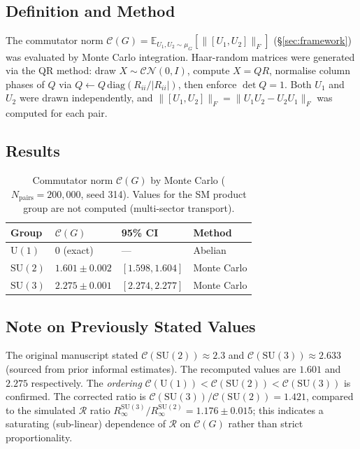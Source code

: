 \documentclass[12pt,a4paper]{article}
\newcommand{\R}{\mathcal{R}}           %
\newcommand{\SU}[1]{\mathrm{SU}(#1)}
\newcommand{\UN}[1]{\mathrm{U}(#1)}
\theoremstyle{plain}
\theoremstyle{definition}
\theoremstyle{remark}
\begin{document}
\subsection*{Definition and Method}

The commutator norm $\mathcal{C}(G) = \mathbb{E}_{U_1,U_2\sim\mu_G}[\|[U_1,U_2]\|_F]$
(§\ref{sec:framework}) was evaluated by Monte Carlo integration.
Haar-random matrices were generated via the QR method: draw
$X\sim\mathcal{CN}(0,I)$, compute $X=QR$, normalise column phases of $Q$ via
$Q \leftarrow Q\,\mathrm{diag}(R_{ii}/|R_{ii}|)$, then enforce $\det Q = 1$.
Both $U_1$ and $U_2$ were drawn independently, and
$\|[U_1,U_2]\|_F = \|U_1 U_2 - U_2 U_1\|_F$ was computed for each pair.

\subsection*{Results}

\begin{table}[H]
\centering
\caption{Commutator norm $\mathcal{C}(G)$ by Monte Carlo ($N_\text{pairs}=200{,}000$,
  seed 314). Values for the SM product group are not computed (multi-sector transport).}
\label{tab:commutator}
\begin{tabular}{llll}
\toprule
Group & $\mathcal{C}(G)$ & 95\% CI & Method \\
\midrule
$\UN{1}$ & $0$ (exact) & --- & Abelian \\
$\SU{2}$ & $1.601\pm0.002$ & $[1.598, 1.604]$ & Monte Carlo \\
$\SU{3}$ & $2.275\pm0.001$ & $[2.274, 2.277]$ & Monte Carlo \\
\bottomrule
\end{tabular}
\end{table}

\subsection*{Note on Previously Stated Values}

The original manuscript stated $\mathcal{C}(\SU{2})\approx2.3$ and
$\mathcal{C}(\SU{3})\approx2.633$ (sourced from prior informal estimates).
The recomputed values are $1.601$ and $2.275$ respectively.
The \emph{ordering} $\mathcal{C}(\UN{1})<\mathcal{C}(\SU{2})<\mathcal{C}(\SU{3})$
is confirmed.
The corrected ratio is $\mathcal{C}(\SU{3})/\mathcal{C}(\SU{2})=1.421$, compared
to the simulated $\R$ ratio $R_\infty^{\SU{3}}/R_\infty^{\SU{2}}=1.176\pm0.015$;
this indicates a saturating (sub-linear) dependence of $\R$ on $\mathcal{C}(G)$
rather than strict proportionality.
\end{document}
